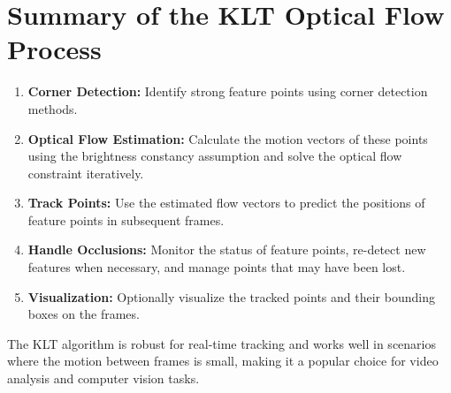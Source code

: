 \documentclass{article}
\begin{document}
\section{Summary of the KLT Optical Flow Process}
\begin{enumerate}
    \item \textbf{Corner Detection:} Identify strong feature points using corner detection methods.
    \item \textbf{Optical Flow Estimation:} Calculate the motion vectors of these points using the brightness constancy assumption and solve the optical flow constraint iteratively.
    \item \textbf{Track Points:} Use the estimated flow vectors to predict the positions of feature points in subsequent frames.
    \item \textbf{Handle Occlusions:} Monitor the status of feature points, re-detect new features when necessary, and manage points that may have been lost.
    \item \textbf{Visualization:} Optionally visualize the tracked points and their bounding boxes on the frames.
\end{enumerate}

The KLT algorithm is robust for real-time tracking and works well in scenarios where the motion between frames is small, making it a popular choice for video analysis and computer vision tasks.
\end{document}
